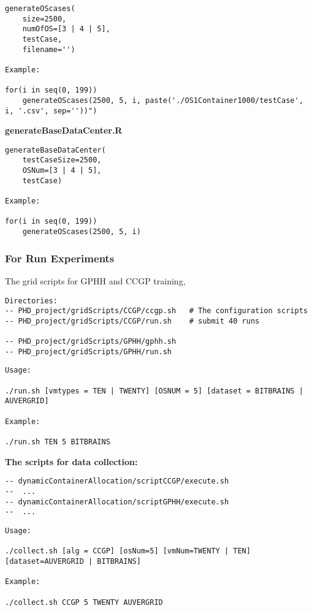 \begin{lstlisting}
generateOScases(
	size=2500, 
	numOfOS=[3 | 4 | 5], 
	testCase, 
	filename='')

Example:

for(i in seq(0, 199)) 
	generateOScases(2500, 5, i, paste('./OS1Container1000/testCase', i, '.csv', sep=''))")
\end{lstlisting}

\begin{flushleft}\textbf{generateBaseDataCenter.R}\end{flushleft}

\begin{lstlisting}
generateBaseDataCenter(
	testCaseSize=2500, 
	OSNum=[3 | 4 | 5], 
	testCase)

Example:

for(i in seq(0, 199)) 
	generateOScases(2500, 5, i)
\end{lstlisting}


\subsubsection{For Run Experiments}
The grid scripts for GPHH and CCGP training,
\begin{lstlisting}
Directories:
-- PHD_project/gridScripts/CCGP/ccgp.sh   # The configuration scripts
-- PHD_project/gridScripts/CCGP/run.sh	  # submit 40 runs

-- PHD_project/gridScripts/GPHH/gphh.sh
-- PHD_project/gridScripts/GPHH/run.sh
\end{lstlisting}


\begin{lstlisting}
Usage:

./run.sh [vmtypes = TEN | TWENTY] [OSNUM = 5] [dataset = BITBRAINS | AUVERGRID]

Example:

./run.sh TEN 5 BITBRAINS
\end{lstlisting}

\begin{flushleft}\textbf{The scripts for data collection:}\end{flushleft}

\begin{lstlisting}
-- dynamicContainerAllocation/scriptCCGP/execute.sh
--	...
-- dynamicContainerAllocation/scriptGPHH/execute.sh
--  ...
\end{lstlisting}


\begin{lstlisting}
Usage:

./collect.sh [alg = CCGP] [osNum=5] [vmNum=TWENTY | TEN] [dataset=AUVERGRID | BITBRAINS]

Example:

./collect.sh CCGP 5 TWENTY AUVERGRID
\end{lstlisting}



